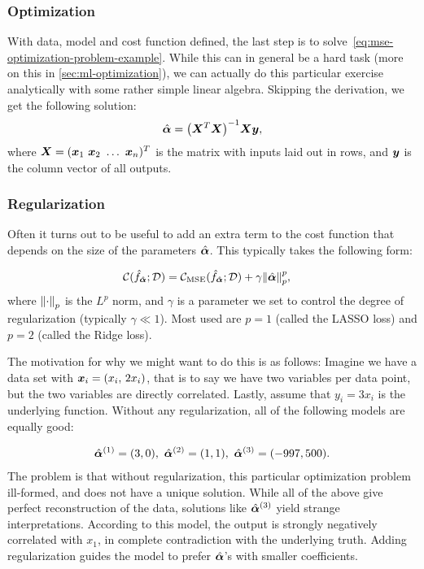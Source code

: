 \documentclass[Thesis.tex]{subfiles}
\begin{document}
\subsubsection{Optimization}

With data, model and cost function defined, the last step is to
solve~\cref{eq:mse-optimization-problem-example}. While this can in general be a
hard task (more on this in \cref{sec:ml-optimization}), we can
actually do this particular exercise analytically with some rather simple linear algebra. Skipping
the derivation, we get the following solution:
\begin{align}
  \hat{\bm{\alpha}} = \qty(\bm{X}^T\bm{X})^{-1}\bm{X}\bm{y},
\end{align}
where $\vX = (\vx_1\ \vx_2\ \dots\ \vx_n)^T$ is the matrix with inputs laid out in
rows, and $\bm{y}$ is the column vector of all outputs.

\subsubsection{Regularization}

Often it turns out to be useful to add an extra term to the cost function
that depends on the size of the parameters $\hat{\bm{\alpha}}$. This typically takes
the following form:

\begin{align}
  \mathcal{C}(\hat f_{\hat{\bm{\alpha}}};\mathcal{D}) &=   \mathcal{C}_\text{MSE}(\hat f_{\hat{\bm{\alpha}}};\mathcal{D}) + \gamma\norm{\hat{\bm{\alpha}}}_p^p,
\end{align}
where $\norm{\cdot}_p$ is the $L^p$ norm, and $\gamma$ is a parameter
we set to control the degree of regularization (typically $\gamma\ll 1$). Most
used are $p=1$ (called the LASSO loss) and $p=2$ (called the Ridge loss).

The motivation for why we might want to do this is as follows: Imagine we have
a data set with $\bm{x}_i = (x_i,\,2x_i)$, that is to say we have two variables per
data point, but the two variables are directly correlated. Lastly, assume that
$y_i = 3x_i$ is the underlying function. Without any regularization, all of the
following models are equally good:

\begin{align}
  \hat\valpha^{(1)} = (3, 0),\ \hat\valpha^{(2)} = (1, 1),\ \hat\valpha^{(3)} = (-997, 500).
\end{align}
The problem is that without regularization, this particular
optimization problem ill-formed, and does not have a unique solution. While all
of the above give perfect reconstruction of the data, solutions like
$\hat{\bm{\alpha}}^{(3)}$ yield strange interpretations. According to this model, the
output is strongly negatively correlated with $x_1$, in complete contradiction
with the underlying truth. Adding regularization guides the model to prefer
$\hat{\bm{\alpha}}$'s with smaller coefficients.
\end{document}

